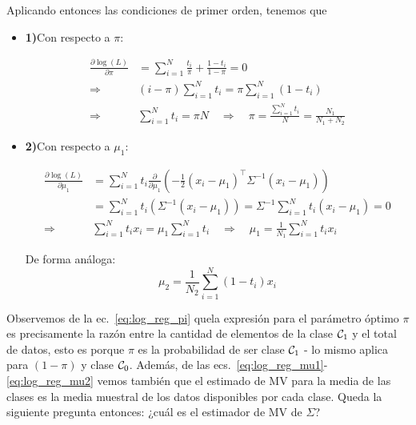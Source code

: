 Aplicando entonces las condiciones de primer orden, tenemos que 
\begin{itemize}
	
\item \textbf{1)}Con respecto a $\pi$:
	
	\begin{align}
	\frac{\partial\log(L)}{\partial\pi} &= \sum_{i=1}^N \frac{t_i}{\pi}+\frac{1-t_i}{1-\pi}=0\nonumber\\
	\Rightarrow \quad & (i-\pi)\sum_{i=1}^Nt_i = \pi\sum_{i=1}^N(1-t_i)\nonumber\\
	\Rightarrow \quad & \sum_{i=1}^Nt_i=\pi N \quad\Rightarrow\quad \pi = \frac{\sum_{i=1}^Nt_i}{N} = \frac{N_1}{N_1+N_2} \label{eq:log_reg_pi}
	\end{align}
		
\item \textbf{2)}Con respecto a $\mu_1$:
	
	\begin{align}
	\frac{\partial\log(L)}{\partial\mu_1} &= \sum_{i=1}^N t_i
	\frac{\partial}{\partial \mu_1}(-\frac{1}{2}(x_i-\mu_1)^\top \Sigma^{-1}(x_i-\mu_1))\nonumber\\
	&= \sum_{i=1}^N t_i(\Sigma^{-1}(x_i-\mu_1)) =
	\Sigma^{-1}\sum_{i=1}^N t_i(x_i-\mu_1) = 0\nonumber\\
	\Rightarrow\quad & \sum_{i=1}^Nt_ix_i= \mu_1\sum_{i=1}^N t_i
	\quad\Rightarrow\quad \mu_1 = \frac{1}{N_1}\sum_{i=1}^Nt_ix_i \label{eq:log_reg_mu1}
	\end{align}
	
	De forma análoga:
	\begin{equation}
	\mu_2 = \frac{1}{N_2}\sum_{i=1}^N(1-t_i)x_i\label{eq:log_reg_mu2}
	\end{equation}
	
\end{itemize}

\begin{remark}\label{rem:log_reg_interpretacion_ML}
Observemos de la ec.~\eqref{eq:log_reg_pi} quela expresión para el parámetro  óptimo $\pi$ es precisamente la razón entre la cantidad de elementos de la clase ${\mathcal C}_1$ y el total de datos, esto es porque $\pi$ es la probabilidad de ser clase ${\mathcal C}_1$ - lo mismo aplica para $(1-\pi)$ y clase ${\mathcal C}_0$. Además, de las ecs.~\eqref{eq:log_reg_mu1}-\eqref{eq:log_reg_mu2} vemos también que el estimado de MV para la media de las clases es la media muestral de los datos disponibles por cada clase. Queda la siguiente pregunta entonces: ¿cuál es el estimador de MV de $\Sigma$?
\end{remark}

